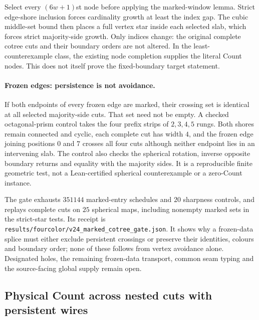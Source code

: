 Select every $(6w+1)$st node before applying the marked-window lemma.
Strict edge-shore inclusion forces cardinality growth at least the
index gap.  The cubic middle-set bound then places a full vertex star
inside each selected slab, which forces strict majority-side growth.
Only indices change: the original complete cotree cuts and their
boundary orders are not altered.  In the least-counterexample class,
the existing node completion supplies the literal Count nodes.  This
does not itself prove the fixed-boundary target statement.

\paragraph{Frozen edges: persistence is not avoidance.}
If both endpoints of every frozen edge are marked, their crossing set
is identical at all selected majority-side cuts.
That set need not be empty.  A checked octagonal-prism control takes
the four prefix strips of $2,3,4,5$ rungs.  Both shores remain connected
and cyclic, each complete cut has width $4$, and the frozen edge joining
positions $0$ and $7$ crosses all four cuts although neither endpoint
lies in an intervening slab.  The control also checks the spherical
rotation, inverse opposite boundary returns and equality with the
majority sides.  It is a reproducible finite geometric test, not a
Lean-certified spherical counterexample or a zero-Count instance.

The gate exhausts $351144$ marked-entry schedules and $20$ sharpness
controls, and replays complete cuts on $25$ spherical maps, including
nonempty marked sets in the strict-star tests.  Its receipt is
\texttt{results/fourcolor/v24\_marked\_cotree\_gate.json}.
It shows why a frozen-data splice must either exclude persistent
crossings or preserve their identities, colours and boundary order;
none of these follows from vertex avoidance alone.  Designated holes,
the remaining frozen-data transport, common seam typing and the
source-facing global supply remain open.

\subsection{Physical Count across nested cuts with persistent wires}
\label{sec:nested-side-wires}

